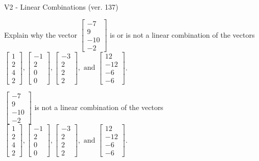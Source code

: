 \begin{exercise}
  \begin{exerciseTitle}V2 - Linear Combinations (ver. 137)\end{exerciseTitle}
  \begin{exerciseStatement}
    Explain why the vector \(\left[\begin{array}{c}
-7 \\
9 \\
-10 \\
-2
\end{array}\right]\)  is or is not a linear 
	combination of the vectors \(\left[\begin{array}{c}
1 \\
2 \\
4 \\
2
\end{array}\right] , \left[\begin{array}{c}
-1 \\
2 \\
0 \\
0
\end{array}\right] , \left[\begin{array}{c}
-3 \\
2 \\
2 \\
2
\end{array}\right] , \text{ and } \left[\begin{array}{c}
12 \\
-12 \\
-6 \\
-6
\end{array}\right]\).
	


  \end{exerciseStatement}
  \begin{exerciseAnswer}
   \(\left[\begin{array}{c}
-7 \\
9 \\
-10 \\
-2
\end{array}\right]\) 
  	 is not  
	a linear combination of the vectors \(\left[\begin{array}{c}
1 \\
2 \\
4 \\
2
\end{array}\right] , \left[\begin{array}{c}
-1 \\
2 \\
0 \\
0
\end{array}\right] , \left[\begin{array}{c}
-3 \\
2 \\
2 \\
2
\end{array}\right] , \text{ and } \left[\begin{array}{c}
12 \\
-12 \\
-6 \\
-6
\end{array}\right]\).


\end{exerciseAnswer}
\end{exercise}
